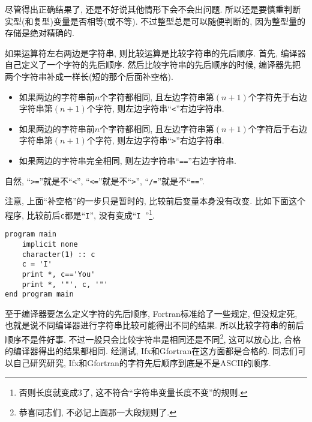 尽管得出正确结果了, 还是不好说其他情形下会不会出问题. 所以还是要慎重判断实型(和复型)变量是否相等(或不等). 不过整型总是可以随便判断的, 因为整型量的存储是绝对精确的.

如果运算符左右两边是字符串, 则比较运算是比较字符串的先后顺序. 首先, 编译器自己定义了一个字符的先后顺序. 然后比较字符串的先后顺序的时候, 编译器先把两个字符串补成一样长(短的那个后面补空格).
\begin{itemize}
    \item 如果两边的字符串前$n$个字符都相同, 且左边字符串第$(n+1)$个字符先于右边字符串第$(n+1)$个字符, 则左边字符串``\texttt{<}''右边字符串.
    \item 如果两边的字符串前$n$个字符都相同, 且左边字符串第$(n+1)$个字符后于右边字符串第$(n+1)$个字符, 则左边字符串``\texttt{>}''右边字符串.
    \item 如果两边的字符串完全相同, 则左边字符串``\texttt{==}''右边字符串.
\end{itemize}
自然, ``\texttt{>=}''就是不``\texttt{<}'', ``\texttt{<=}''就是不``\texttt{>}'', ``\texttt{/=}''就是不``\texttt{==}''.

注意, 上面``补空格''的一步只是暂时的, 比较前后变量本身没有改变. 比如下面这个程序, 比较前后\texttt{c}都是``\texttt{I}'', 没有变成``\texttt{I  }''\footnote{
否则长度就变成3了, 这不符合``字符串变量长度不变''的规则.
}.
\begin{lstlisting}
program main
    implicit none
    character(1) :: c
    c = 'I'
    print *, c=='You'
    print *, '"', c, '"'
end program main
\end{lstlisting}

至于编译器要怎么定义字符的先后顺序, Fortran标准给了一些规定, 但没规定死, 也就是说不同编译器进行字符串比较可能得出不同的结果. 所以比较字符串的前后顺序不是件好事. 不过一般只会比较字符串是相同还是不同\footnote{
    恭喜同志们, 不必记上面那一大段规则了.
}, 这可以放心比, 合格的编译器得出的结果都相同. 经测试, Ifx和Gfortran在这方面都是合格的. 同志们可以自己研究研究, Ifx和Gfortran的字符先后顺序到底是不是ASCII的顺序.
